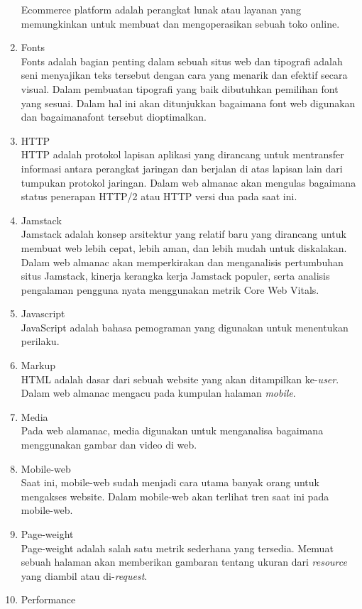 \begin{enumerate}
	Ecommerce platform adalah perangkat lunak atau layanan yang memungkinkan untuk membuat dan mengoperasikan sebuah toko online.
	\item Fonts\\
	Fonts adalah bagian penting dalam sebuah situs web dan tipografi adalah seni menyajikan teks tersebut dengan cara yang menarik dan efektif secara visual. Dalam pembuatan tipografi yang baik dibutuhkan pemilihan font yang sesuai. Dalam hal ini akan ditunjukkan bagaimana font web digunakan dan bagaimanafont tersebut dioptimalkan. 
	\item HTTP\\
	HTTP adalah protokol lapisan aplikasi yang dirancang untuk mentransfer informasi antara perangkat jaringan dan berjalan di atas lapisan lain dari tumpukan protokol jaringan. Dalam web almanac akan mengulas bagaimana status penerapan HTTP/2 atau HTTP versi dua pada saat ini.
	\item Jamstack\\
	Jamstack adalah konsep arsitektur yang relatif baru yang dirancang untuk membuat web lebih cepat, lebih aman, dan lebih mudah untuk diskalakan. Dalam web almanac akan memperkirakan dan menganalisis pertumbuhan situs Jamstack, kinerja kerangka kerja Jamstack populer, serta analisis pengalaman pengguna nyata menggunakan metrik Core Web Vitals.
	\item Javascript\\
	JavaScript adalah bahasa pemograman yang digunakan untuk menentukan perilaku. 
	\item Markup\\
	HTML adalah dasar dari sebuah website yang akan ditampilkan ke-\textit{user}. Dalam web almanac mengacu pada kumpulan halaman \textit{mobile}.
	\item Media\\
	Pada web alamanac, media digunakan untuk menganalisa bagaimana menggunakan gambar dan video di web.
	\item Mobile-web\\
	Saat ini, mobile-web sudah menjadi cara utama banyak orang untuk mengakses website. Dalam mobile-web akan terlihat tren saat ini pada mobile-web.
	\item Page-weight\\
	Page-weight adalah salah satu metrik sederhana yang tersedia. Memuat sebuah halaman akan memberikan gambaran tentang ukuran dari \textit{resource} yang diambil atau di-\textit{request}.    \item Performance\\

\end{enumerate}
